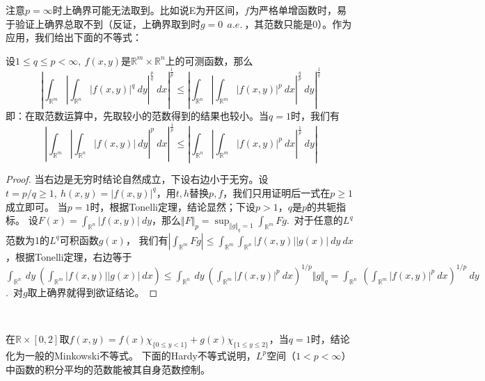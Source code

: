 \documentclass[color=green,thmcnt=section,lang=cn,12pt]{elegantbook}
\numberwithin{equation}{section}%
\numberwithin{figure}{section}%
\newcommand{\RR}{\mathbb{R}}
\renewcommand{\RN}{\RR^n}
\newcommand{\normp}[2]{\Vert #1 \Vert_{#2}}
\begin{document}
注意$p=\infty$时上确界可能无法取到。比如说E为开区间，$f$为严格单增函数时，易于验证上确界总取不到（反证，上确界取到时$g=0\ \ a.e.\ $，其范数只能是0）。作为应用，我们给出下面的不等式：


\begin{theorem}[广义Minkowski不等式]\label{guangyiminkowski}
    设$1\leq q\leq p<\infty,\ f(x,y)$是$\RR^m\times \RR^n$上的可测函数，那么
    \begin{equation*}
        \left\lvert \int_{\RR^m}\left\lvert \int_{\RN}|f(x,y)|^q\ dy\right\rvert  ^{\frac{p}{q}}\ dx\right\rvert ^{\frac{1}{p}}
    \leq         \left\lvert \int_{\RR^n}\left\lvert \int_{\RR^m}|f(x,y)|^p\ dx\right\rvert  ^{\frac{q}{p}}\ dy\right\rvert ^{\frac{1}{q}}
    \end{equation*}
    即：在取范数运算中，先取较小的范数得到的结果也较小。当$q=1$时，我们有
    \begin{equation*}
        \left\lvert \int_{\RR^m}\left\lvert \int_{\RN}|f(x,y)|\ dy\right\rvert  ^{p}\ dx\right\rvert ^{\frac{1}{p}}
    \leq         \left\lvert \int_{\RR^n}\left\lvert \int_{\RR^m}|f(x,y)|^p\ dx\right\rvert  ^{\frac{1}{p}}\ dy\right\rvert
    \end{equation*}
\end{theorem}
\begin{proof}
    当右边是无穷时结论自然成立，下设右边小于无穷。设$t=p/q\geq 1,\ h(x,y)=|f(x,y)|^q$，用$t,h$替换$p,f$，我们只用证明后一式在$p\geq 1$成立即可。
    当$p=1$时，根据Tonelli定理，结论显然；下设$p>1$，$q$是$p$的共轭指标。
    设$F(x)=\int_{\RN}|f(x,y)|\ dy$，那么$\normp{F}{p}=\sup_{\normp{g}{q}=1}\int_{\RR^m}Fg$.\ 对于任意的$L^q$范数为1的$L^q$可积函数$g(x)$，
    我们有$|\int_{\RR^m}Fg|\leq \int_{\RR^m}\int_{\RR^n}|f(x,y)||g(x)|\ dy\ dx$，根据Tonelli定理，右边等于
    $\int_{\RN}\ dy\ (\int_{\RR^m}|f(x,y)||g(x)|\ dx)\leq  \int_{\RN}\ dy\ (\int_{\RR^m}|f(x,y)|^p\ dx)^{1/p}\normp{g}{q}=\int_{\RN}\ (\int_{\RR^m}|f(x,y)|^p\ dx)^{1/p}\ dy$.\ 
    对$g$取上确界就得到欲证结论。
\end{proof}
\ 


在$\RR\times [0,2]$取$f(x,y)=f(x)\chi_{\{0\leq y<1\}}+g(x)\chi_{\{1\leq y\leq 2\}}$，当$q=1$时，结论化为一般的Minkowski不等式。
下面的Hardy不等式说明，$L^p$空间（$1<p<\infty$）中函数的积分平均的范数能被其自身范数控制。\\
\ 
\end{document}

